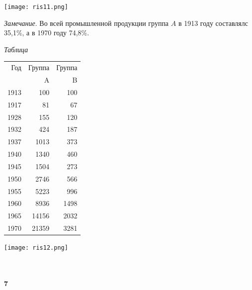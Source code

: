 \begin{center}
\texttt{[image: ris11.png]}
	\begin{minipage}{0.25\textwidth}
  		\textit{Замечание}. Во всей промышленной продукции группа $A$ в 1913 году составлялс 35,1\%, а в 1970 году 74,8\%.
	\begin{flushright}
		\textit{Таблица}
	\end{flushright}
	\begin{tabular}{|r |r| r|}
		\hline
		Год & Группа & Группа\\
		& A &B\\
		\hline
		1913&100&100\\
		1917&81&67\\
		1928&155&120\\
		1932&424&187\\
		1937&1013&373\\
		1940&1340&460\\
		1945&1504&273\\
		1950&2746&566\\
		1955&5223&996\\
		1960&8936&1498\\
		1965&14156&2032\\
		1970&21359&3281
	\end{tabular}
	\end{minipage}
\hfill
	\begin{minipage}{0.65\textwidth}
  		\texttt{[image: ris12.png]}
		\\\\\\
		\begin{flushright}
			\large{\textbf{7}}
		\end{flushright}
	\end{minipage}
\end{center} 